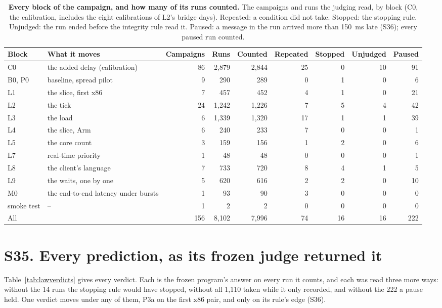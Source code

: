 \documentclass[10pt,journal,onecolumn]{IEEEtran}
\begin{document}
\begin{table}[htbp]
\caption{\textbf{Every block of the campaign, and how many of its runs counted.} The campaigns and
runs the judging read, by block (C0, the calibration, includes the eight calibrations of L2's
bridge days). Repeated: a condition did not take. Stopped: the stopping rule. Unjudged: the run
ended before the integrity rule read it. Paused: a message in the run arrived more than 150~ms
late (S36); every paused run counted.}
\label{tab:lawblocks}
\centering
\footnotesize
\begin{tabular}{@{}llrrrrrrr@{}}
\toprule
Block & What it moves & Campaigns & Runs & Counted & Repeated & Stopped & Unjudged & Paused\\
\midrule
C0 & the added delay (calibration) & 86 & 2,879 & 2,844 & 25 & 0 & 10 & 91\\
B0, P0 & baseline, spread pilot & 9 & 290 & 289 & 0 & 1 & 0 & 6\\
L1 & the slice, first x86 & 7 & 457 & 452 & 4 & 1 & 0 & 21\\
L2 & the tick & 24 & 1,242 & 1,226 & 7 & 5 & 4 & 42\\
L3 & the load & 6 & 1,339 & 1,320 & 17 & 1 & 1 & 39\\
L4 & the slice, Arm & 6 & 240 & 233 & 7 & 0 & 0 & 1\\
L5 & the core count & 3 & 159 & 156 & 1 & 2 & 0 & 6\\
L7 & real-time priority & 1 & 48 & 48 & 0 & 0 & 0 & 1\\
L8 & the client's language & 7 & 733 & 720 & 8 & 4 & 1 & 5\\
L9 & the waits, one by one & 5 & 620 & 616 & 2 & 2 & 0 & 10\\
M0 & the end-to-end latency under bursts & 1 & 93 & 90 & 3 & 0 & 0 & 0\\
smoke test & -- & 1 & 2 & 2 & 0 & 0 & 0 & 0\\
\midrule
All & & 156 & 8,102 & 7,996 & 74 & 16 & 16 & 222\\
\bottomrule
\end{tabular}
\end{table}

\section{S35. Every prediction, as its frozen judge returned it}
\label{sec:lawverdicts}

Table~\ref{tab:lawverdicts} gives every verdict. Each is the frozen program's answer on every run
it counts, and each was read three more ways: without the 14 runs the stopping rule would have stopped,
without all 1,110 taken while it only recorded, and without the 222 a pause held. One verdict
moves under any of them, P3a on the first x86 pair, and only on its rule's edge (S36).
\end{document}
